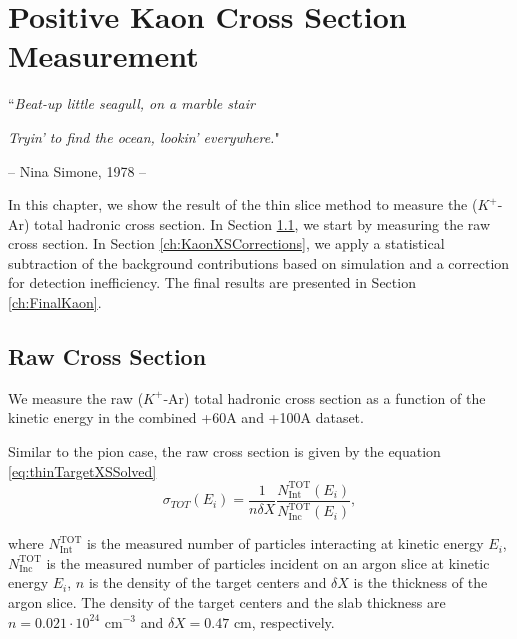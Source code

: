 \chapter{Positive Kaon Cross Section Measurement}\label{ch:KaonXS}
{\raggedleft ``\emph{Beat-up little seagull, on a marble stair} \par}
{\raggedleft \emph{Tryin' to find the ocean, lookin' everywhere.}"\par}
{\raggedleft -- Nina Simone, 1978 -- \par}%
\vspace{0.5cm}

In this chapter, we show the result of the thin slice method to measure  the ($K^+$-Ar) total hadronic cross section. In Section \ref{ch:KaonXSRaw}, we start by measuring the raw cross section. In Section \ref{ch:KaonXSCorrections}, we apply a statistical subtraction of the background contributions based on simulation and a correction for detection inefficiency. The final results are presented in Section \ref{ch:FinalKaon}.


\section{Raw Cross Section}\label{ch:KaonXSRaw}
We measure the raw ($K^+$-Ar) total hadronic cross section as a function of the kinetic energy in the combined +60A and +100A dataset. 

Similar to the pion case,  the raw cross section is given by the equation \ref{eq:thinTargetXSSolved}
\begin{equation}
 \sigma_{TOT} (E_i)  = \frac{1}{n \delta X}\frac{N^{\text{TOT}}_{\text{Int}}(E_i)}{N^{\text{TOT}}_{\text{Inc}}(E_i)},
\end{equation}

where $N^{\text{TOT}}_{\text{Int}}$  is the measured number of particles interacting at kinetic energy $E_i$, $N^{\text{TOT}}_{\text{Inc}}$ is the  measured  number of particles incident  on an argon slice at  kinetic energy $E_i$,  $n$ is the density of the target centers  and $\delta X$ is the thickness of the argon slice. The density of the target centers and the slab thickness are $n = 0.021\cdot10^{24} \text{ cm}^{-3} $ and  $\delta X=0.47\text{ cm}$, respectively.


